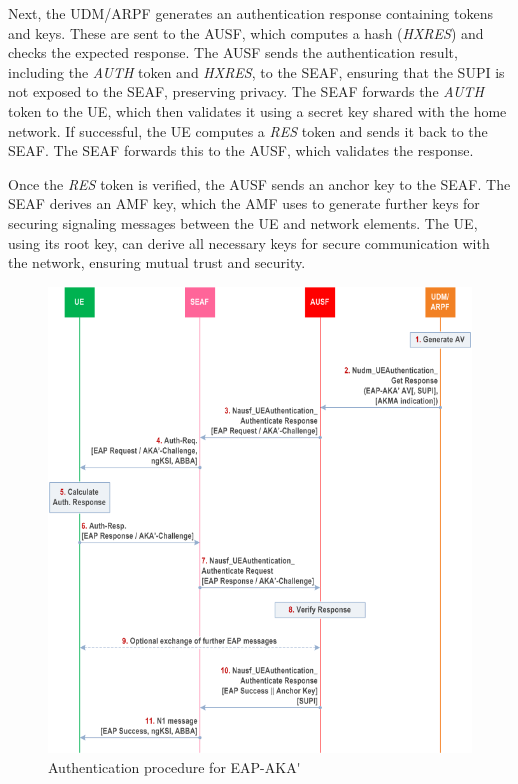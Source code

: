 Next, the \ac{UDM}/\ac{ARPF} generates an authentication response containing tokens and keys. These are sent to the \ac{AUSF}, which computes a hash (\textit{HXRES}) and checks the expected response. The \ac{AUSF} sends the authentication result, including the \textit{AUTH} token and \textit{HXRES}, to the \ac{SEAF}, ensuring that the \ac{SUPI} is not exposed to the \ac{SEAF}, preserving privacy. The \ac{SEAF} forwards the \textit{AUTH} token to the \ac{UE}, which then validates it using a secret key shared with the home network. If successful, the \ac{UE} computes a \textit{RES} token and sends it back to the \ac{SEAF}. The \ac{SEAF} forwards this to the \ac{AUSF}, which validates the response.

Once the \textit{RES} token is verified, the \ac{AUSF} sends an anchor key to the \ac{SEAF}. The \ac{SEAF} derives an \acs{AMF} key, which the \acl{AMF} uses to generate further keys for securing signaling messages between the \ac{UE} and network elements. The \ac{UE}, using its root key, can derive all necessary keys for secure communication with the network, ensuring mutual trust and security.

\begin{figure}
    \centering
    \includegraphics[width=0.75\linewidth]{figs/Authentication procedure for EAP-AKA'.png}
    \caption{Authentication procedure for \ac{EAP-AKA'}}
    \label{fig:Authentication procedure for EAP-AKA'}
\end{figure}


